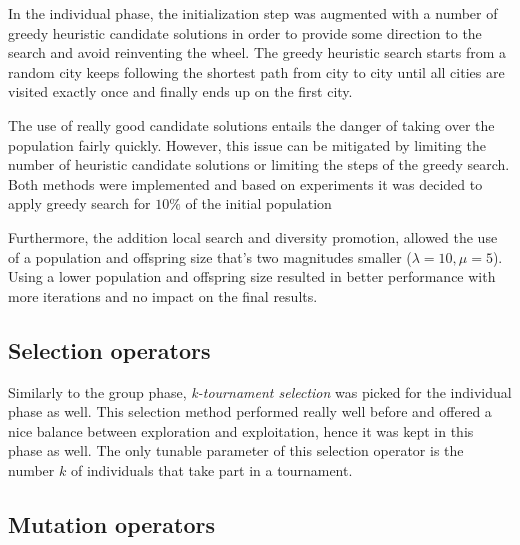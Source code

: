 \documentclass[a4paper,10pt]{article}
\newcommand{\ReplaceMe}[1]{{\color{blue}#1}}
\begin{document}
In the individual phase, the initialization step was augmented with a number of greedy heuristic candidate solutions in order to provide some direction to the search and avoid reinventing the wheel. The greedy heuristic search starts from a random city keeps following the shortest path from city to city until all cities are visited exactly once and finally ends up on the first city.  

The use of really good candidate solutions entails the danger of taking over the population fairly quickly. However, this issue can be mitigated by limiting the number of heuristic candidate solutions or limiting the steps of the greedy search. Both methods were implemented and based on experiments it was decided to apply greedy search for $10\%$ of the initial population

Furthermore, the addition local search and diversity promotion, allowed the use of a population and offspring size that's two magnitudes smaller ($\lambda = 10, \mu=5$). Using a lower population and offspring size resulted in better performance with more iterations and no impact on the final results.

\subsection{Selection operators} \label{ss:selection}

Similarly to the group phase, \textit{k-tournament selection} was picked for the individual phase as well. This selection method performed really well before and offered a nice balance between exploration and exploitation, hence it was kept in this phase as well. The only tunable parameter of this selection operator is the number $k$ of individuals that take part in a tournament.

\subsection{Mutation operators} \label{ss:mut}

\end{document}
